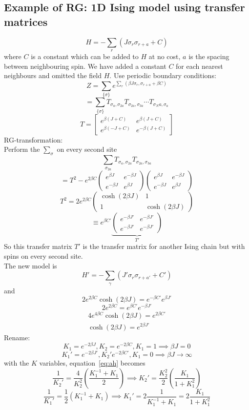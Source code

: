 \documentclass[11pt]{book}
\theoremstyle{definition}
\begin{document}
\subsection{Example of RG: 1D Ising model using transfer matrices}%
\[ H = -\sum_r (J\sigma_r \sigma_{r+a} + C) \] 
where $ C $ is a constant which can be added to $ H $ at no cost, $ a $ is the spacing between neighbouring spin.
We have added a constant $ C $ for each nearest neighbours and omitted the field $ H $.
Use periodic boundary conditions:
\[ Z = \sum_{\{ \sigma \}} e^{\sum_r (\beta J \sigma_r, \sigma_{r+a}+\beta C)} \]
	\[ = \sum_{\{\sigma\}} T_{\sigma_a, \sigma_{2a}} T_{\sigma_{2a}, \sigma_{3a}} \cdots T_{\sigma_Na, \sigma_a}\] 
	\[ T = \begin{bmatrix}
		e^{\beta (J+C)} & e^{\beta (J+C)} \\
		e^{\beta(-J+C)} & e^{-\beta(J+C)}
	\end{bmatrix} \] 
RG-transformation: \\
Perform the $ \sum_{\sigma} $ on every second site
\[ \sum_{\sigma_{2a}} T_{\sigma_a, \sigma_{2a}} T_{\sigma_{2a}, \sigma_{3a}}  \] 
\[ = T^2 - e^{2\beta C}\begin{pmatrix}
	e^{\beta J} & e^{-\beta J} \\
	e^{-\beta J} & e^{\beta J}
\end{pmatrix} 
\begin{pmatrix}
	e^{\beta J} & e^{-\beta J} \\
	e^{-\beta J} & e^{\beta J}
\end{pmatrix} \] 
\[ T^2 = 2e^{2\beta C}\begin{pmatrix}
	\cosh(2\beta J) & 1 \\
	1 & \cosh(2\beta J)
\end{pmatrix} \] 
\[ \equiv e^{\beta C'} 
	\underbrace{\begin{pmatrix}
	e^{-\beta J'} & e^{-\beta J'} \\
	e^{-\beta J'} & e^{-\beta J'}
\end{pmatrix}}_{T'} \] 
So this transfer matrix $ T' $ is the transfer matrix for another Ising chain but with spins on every second site. \\
The new model is 
\[ H' = -\sum_{\gamma} \left( J' \sigma_r \sigma_{r+a'} + C' \right)  \] 
and
\[ 2e^{2\beta C}\cosh(2\beta J) = e^{-\beta C'} e^{\beta J'} \] 
\[ 2e^{2\beta C} = e^{\beta C'}e^{-\beta J'} \] 
\begin{equation}
	\label{eq:ah}
	\begin{aligned}
 		4e^{4\beta C} \cosh(2\beta J) = e^{2\beta C'} \\
 		\cosh(2\beta J) = e^{2\beta J'} 
	\end{aligned}
\end{equation}
Rename:
\[ K_1 = e^{-2\beta J}, K_2 = e^{-2\beta C}, K_1 =1 \implies \beta J = 0 \] 
\[ K_1' = e^{-2\beta J'}, K_2' e^{-2\beta C'}, K_1=0 \implies \beta J \to \infty \] 
with the $ K $ variables, equation~\ref{eq:ah} becomes
\[ \frac{1}{K_2'} = \frac{4}{K_2^2} \left( \frac{K_1^{-1}+K_1}{2} \right) \implies K_2' = \frac{K_2^2}{2}\left( \frac{K_1}{1+K_1^2} \right)  \] 
\[ \frac{1}{K_1'} = \frac{1}{2}\left( K_1^{-1} +K_1 \right) \implies K_1' = 2 \frac{1}{K_1^{-1}+K_1} = 2\frac{K_1}{1+K_1^2} \] 
\end{document}
